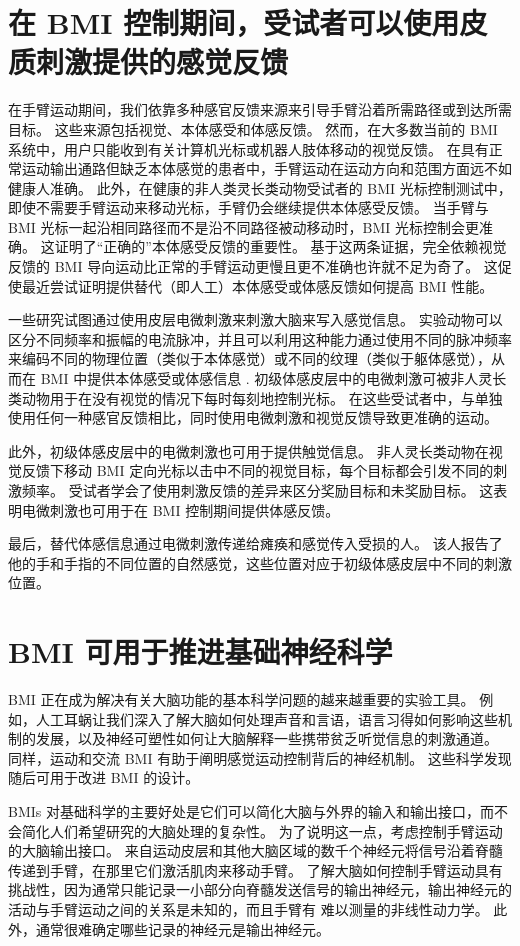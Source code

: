 \section{在 BMI 控制期间，受试者可以使用皮质刺激提供的感觉反馈}
在手臂运动期间，我们依靠多种感官反馈来源来引导手臂沿着所需路径或到达所需目标。 这些来源包括视觉、本体感受和体感反馈。 然而，在大多数当前的 BMI 系统中，用户只能收到有关计算机光标或机器人肢体移动的视觉反馈。 在具有正常运动输出通路但缺乏本体感觉的患者中，手臂运动在运动方向和范围方面远不如健康人准确。 此外，在健康的非人类灵长类动物受试者的 BMI 光标控制测试中，即使不需要手臂运动来移动光标，手臂仍会继续提供本体感受反馈。 当手臂与 BMI 光标一起沿相同路径而不是沿不同路径被动移动时，BMI 光标控制会更准确。 这证明了“正确的”本体感受反馈的重要性。 基于这两条证据，完全依赖视觉反馈的 BMI 导向运动比正常的手臂运动更慢且更不准确也许就不足为奇了。 这促使最近尝试证明提供替代（即人工）本体感受或体感反馈如何提高 BMI 性能。

一些研究试图通过使用皮层电微刺激来刺激大脑来写入感觉信息。 实验动物可以区分不同频率和振幅的电流脉冲，并且可以利用这种能力通过使用不同的脉冲频率来编码不同的物理位置（类似于本体感觉）或不同的纹理（类似于躯体感觉），从而在 BMI 中提供本体感受或体感信息 . 初级体感皮层中的电微刺激可被非人灵长类动物用于在没有视觉的情况下每时每刻地控制光标。 在这些受试者中，与单独使用任何一种感官反馈相比，同时使用电微刺激和视觉反馈导致更准确的运动。

此外，初级体感皮层中的电微刺激也可用于提供触觉信息。 非人灵长类动物在视觉反馈下移动 BMI 定向光标以击中不同的视觉目标，每个目标都会引发不同的刺激频率。 受试者学会了使用刺激反馈的差异来区分奖励目标和未奖励目标。 这表明电微刺激也可用于在 BMI 控制期间提供体感反馈。

最后，替代体感信息通过电微刺激传递给瘫痪和感觉传入受损的人。 该人报告了他的手和手指的不同位置的自然感觉，这些位置对应于初级体感皮层中不同的刺激位置。


\section{BMI 可用于推进基础神经科学}

BMI 正在成为解决有关大脑功能的基本科学问题的越来越重要的实验工具。 例如，人工耳蜗让我们深入了解大脑如何处理声音和言语，语言习得如何影响这些机制的发展，以及神经可塑性如何让大脑解释一些携带贫乏听觉信息的刺激通道。 同样，运动和交流 BMI 有助于阐明感觉运动控制背后的神经机制。 这些科学发现随后可用于改进 BMI 的设计。

BMIs 对基础科学的主要好处是它们可以简化大脑与外界的输入和输出接口，而不会简化人们希望研究的大脑处理的复杂性。 为了说明这一点，考虑控制手臂运动的大脑输出接口。 来自运动皮层和其他大脑区域的数千个神经元将信号沿着脊髓传递到手臂，在那里它们激活肌肉来移动手臂。 了解大脑如何控制手臂运动具有挑战性，因为通常只能记录一小部分向脊髓发送信号的输出神经元，输出神经元的活动与手臂运动之间的关系是未知的，而且手臂有 难以测量的非线性动力学。 此外，通常很难确定哪些记录的神经元是输出神经元。

